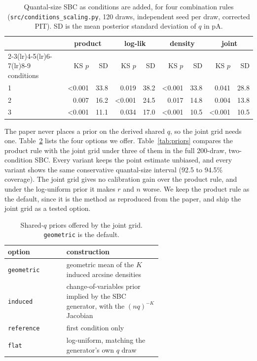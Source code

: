 \documentclass[a4paper, oneside, 10pt]{article}
\begin{document}
\begin{table}[!htb]
\centering
\caption{Quantal-size SBC as conditions are added, for four combination rules (\texttt{src/conditions\_scaling.py}, 120 draws, independent seed per draw, corrected PIT). SD is the mean posterior standard deviation of \(q\) in pA.}
\label{tab:scaling}
\small
\setlength{\tabcolsep}{5pt}
\begin{tabular}{@{}lrrrrrrrr@{}}
\toprule
& \multicolumn{2}{c}{product} & \multicolumn{2}{c}{log-lik}
& \multicolumn{2}{c}{density} & \multicolumn{2}{c}{joint} \\
\cmidrule(lr){2-3}\cmidrule(lr){4-5}\cmidrule(lr){6-7}\cmidrule(lr){8-9}
conditions & KS \(p\) & SD & KS \(p\) & SD & KS \(p\) & SD & KS \(p\) & SD \\
\midrule
1 & \textless0.001 & 33.8 & 0.019 & 38.2 & \textless0.001 & 33.8 & 0.041 & 28.8 \\
2 & 0.007 & 16.2 & \textless0.001 & 24.5 & 0.017 & 14.8 & 0.004 & 13.8 \\
3 & \textless0.001 & 11.1 & 0.034 & 17.0 & \textless0.001 & 10.5 & \textless0.001 & 10.5 \\
\bottomrule
\end{tabular}
\end{table}

The paper never places a prior on the derived shared \(q\), so the joint grid needs one. Table~\ref{tab:qprior} lists the four options we offer. Table~\ref{tab:priors} compares the product rule with the joint grid under three of them in the full 200-draw, two-condition SBC. Every variant keeps the point estimate unbiased, and every variant shows the same conservative quantal-size interval (92.5 to 94.5\% coverage). The joint grid gives no calibration gain over the product rule, and under the log-uniform prior it makes \(r\) and \(n\) worse. We keep the product rule as the default, since it is the method as reproduced from the paper, and ship the joint grid as a tested option.

\begin{table}[!htb]
\centering
\caption{Shared-\(q\) priors offered by the joint grid. \texttt{geometric} is the default.}
\label{tab:qprior}
\begin{tabular}{@{}l>{\raggedright\arraybackslash}p{0.62\linewidth}@{}}
\toprule
option & construction \\
\midrule
\texttt{geometric} & geometric mean of the \(K\) induced arcsine densities \\
\texttt{induced} & change-of-variables prior implied by the SBC generator, with the \((nq)^{-K}\) Jacobian \\
\texttt{reference} & first condition only \\
\texttt{flat} & log-uniform, matching the generator's own \(q\) draw \\
\bottomrule
\end{tabular}
\end{table}
\end{document}
